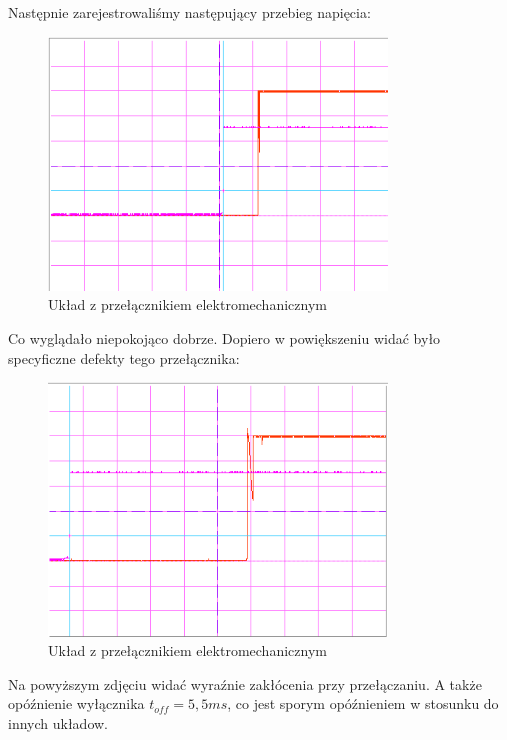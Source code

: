 \documentclass[a4paper,11pt]{article}
\begin{document}
Następnie zarejestrowaliśmy następujący przebieg napięcia: 
\begin{figure} [H]
  \begin{center}
    \includegraphics[width = 9cm]{../Obrazki_i_tekst/obrobione/IIIciety.png}
    \caption{ Układ z przełącznikiem elektromechanicznym }
  \end{center}
\end{figure}

Co wyglądało niepokojąco dobrze. Dopiero w powiększeniu widać było specyficzne defekty tego przełącznika: 
\begin{figure} [H]
  \begin{center}
    \includegraphics[width = 9cm]{../Obrazki_i_tekst/obrobione/IIIlepsiejszeciety.png}
    \caption{ Układ z przełącznikiem elektromechanicznym }
  \end{center}
\end{figure}

Na powyższym zdjęciu widać wyraźnie zakłócenia przy przełączaniu. A także opóźnienie wyłącznika $t_{off}=5,5 ms$, co jest sporym opóźnieniem w stosunku do innych układow.



\end{document}
